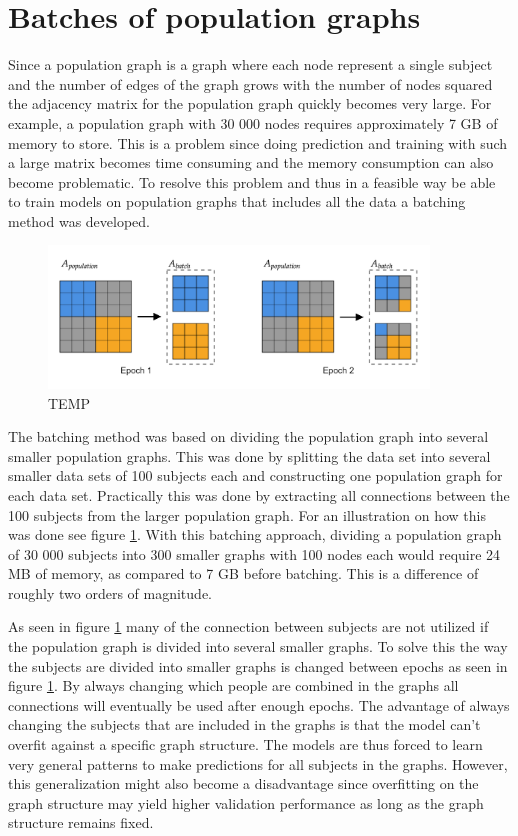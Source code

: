 \section{Batches of population graphs}
Since a population graph is a graph where each node represent a single subject and the number of edges of the graph grows with the number of nodes squared the adjacency matrix for the population graph quickly becomes very large. For example, a population graph with 30 000 nodes requires approximately 7 GB of memory to store. This is a problem since doing prediction and training with such a large matrix becomes time consuming and the memory consumption can also become problematic. To resolve this problem and thus in a feasible way be able to train models on population graphs that includes all the data a batching method was developed. 

\begin{figure}[H]
    \centering
    \includegraphics[width=0.9\textwidth]{chapters/images_methods/batches.png}
    \caption{TEMP}
    \label{fig:batches}
\end{figure}

The batching method was based on dividing the population graph into several smaller population graphs. This was done by splitting the data set into several smaller data sets of 100 subjects each and constructing one population graph for each data set. Practically this was done by extracting all connections between the 100 subjects from the larger population graph. For an illustration on how this was done see figure \ref{fig:batches}. With this batching approach, dividing a population graph of 30 000 subjects into 300 smaller graphs with 100 nodes each would require 24 MB of memory, as compared to 7 GB before batching. This is a difference of roughly two orders of magnitude.

As seen in figure \ref{fig:batches} many of the connection between subjects are not utilized if the population graph is divided into several smaller graphs. To solve this the way the subjects are divided into smaller graphs is changed between epochs as seen in figure \ref{fig:batches}. By always changing which people are combined in the graphs all connections will eventually be used after enough epochs. The advantage of always changing the subjects that are included in the graphs is that the model can't overfit against a specific graph structure. The models are thus forced to learn very general patterns to make predictions for all subjects in the graphs. However, this generalization might also become a disadvantage since overfitting on the graph structure may yield higher validation performance as long as the graph structure remains fixed. 


